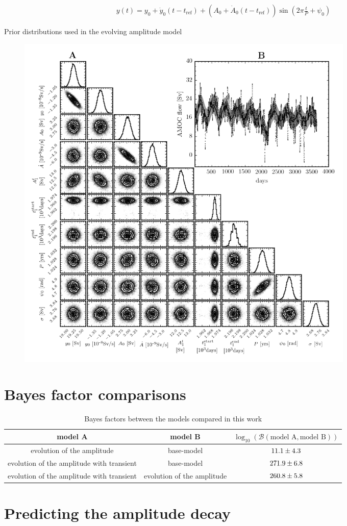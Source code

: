 \documentclass{article}
\newcommand{\tref}{t_{\textrm{ref}}}
\begin{document}
\begin{align}
y(t) = y_0 + \dot{y}_0(t - \tref) + (A_0 + \dot{A}_0(t-\tref)) \sin\left(2\pi \frac{t}{P} + \psi_0\right)
\end{align}

\begin{table}[htb]
\centering
\caption{Prior distributions used in the evolving amplitude model}
\label{tab: base-model}

\end{table}

\begin{figure}[htb]
\centering
\includegraphics[width=0.8\textwidth]{img/BasicSinusoidAmplitudeDecayWithTransient_PosteriorWithFit}
\caption{}
\label{fig:}
\end{figure}

\section{Bayes factor comparisons}
\begin{table}
\centering
\caption{Bayes factors between the models compared in this work}
\label{}
\begin{tabular}{ccc} \hhline{===}
model A & model B & $\log_{10}(\mathcal{B}(\textrm{model A}, \textrm{model B}))$\\ \hline
evolution of the amplitude & base-model &
$ 11.1 \pm
  4.3$\\
evolution of the amplitude with transient & base-model &
$ 271.9 \pm
  6.8$ \\
evolution of the amplitude with transient & evolution of the amplitude &
$ 260.8 \pm
  5.8$
\end{tabular}
\end{table}

\section{Predicting the amplitude decay}
\end{document}
